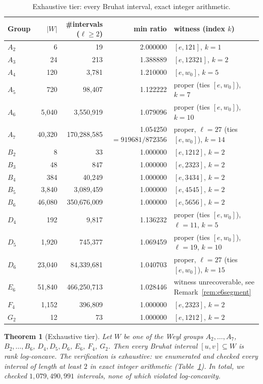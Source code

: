 \documentclass[11pt]{amsart}
\theoremstyle{plain}
\newtheorem{theorem}{Theorem}[section]
\theoremstyle{definition}
\theoremstyle{remark}
\newcommand{\W}{W}
\begin{document}
\begin{table}[htbp]
\centering
\caption{Exhaustive tier: every Bruhat interval, exact integer arithmetic.}
\label{tab:exhaustive}
\small
\begin{tabular}{@{}lrrrl@{}}
\toprule
Group & $|W|$ & \#intervals ($\ell\ge2$) & min ratio & witness (index $k$) \\
\midrule
$A_2$ & 6 & 19 & 2.000000 & $[e,121]$, $k=1$ \\
$A_3$ & 24 & 213 & 1.388889 & $[e,12321]$, $k=2$ \\
$A_4$ & 120 & 3{,}781 & 1.210000 & $[e,w_0]$, $k=5$ \\
$A_5$ & 720 & 98{,}407 & 1.122222 & proper (ties $[e,w_0]$), $k=7$ \\
$A_6$ & 5{,}040 & 3{,}550{,}919 & 1.079096 & proper (ties $[e,w_0]$), $k=10$ \\
$A_7$ & 40{,}320 & 170{,}288{,}585 & 1.054250 $=919681/872356$ & proper, $\ell=27$ (ties $[e,w_0]$), $k=14$ \\
$B_2$ & 8 & 33 & 1.000000 & $[e,1212]$, $k=2$ \\
$B_3$ & 48 & 847 & 1.000000 & $[e,2323]$, $k=2$ \\
$B_4$ & 384 & 40{,}249 & 1.000000 & $[e,3434]$, $k=2$ \\
$B_5$ & 3{,}840 & 3{,}089{,}459 & 1.000000 & $[e,4545]$, $k=2$ \\
$B_6$ & 46{,}080 & 350{,}676{,}009 & 1.000000 & $[e,5656]$, $k=2$ \\
$D_4$ & 192 & 9{,}817 & 1.136232 & proper (ties $[e,w_0]$), $\ell=11$, $k=5$ \\
$D_5$ & 1{,}920 & 745{,}377 & 1.069459 & proper (ties $[e,w_0]$), $\ell=19$, $k=10$ \\
$D_6$ & 23{,}040 & 84{,}339{,}681 & 1.040703 & proper, $\ell=27$ (ties $[e,w_0]$), $k=15$ \\
$E_6$ & 51{,}840 & 466{,}250{,}713 & 1.028446 & witness unrecoverable, see Remark~\ref{rem:e6segment} \\
$F_4$ & 1{,}152 & 396{,}809 & 1.000000 & $[e,2323]$, $k=2$ \\
$G_2$ & 12 & 73 & 1.000000 & $[e,1212]$, $k=2$ \\
\bottomrule
\end{tabular}
\end{table}

\begin{theorem}[Exhaustive tier]
\label{thm:V1}
Let $\W$ be one of the Weyl groups $A_2,\dots,A_7$, $B_2,\dots,B_6$,
$D_4,D_5,D_6$, $E_6$, $F_4$, $G_2$. Then every Bruhat interval
$[u,v]\subseteq \W$ is rank log-concave. The verification is exhaustive: we enumerated and checked every interval of length at least $2$ in exact integer arithmetic
(Table~\ref{tab:exhaustive}). In total, we checked
$1{,}079{,}490{,}991$ intervals, none of which violated log-concavity.
\end{theorem}
\end{document}
